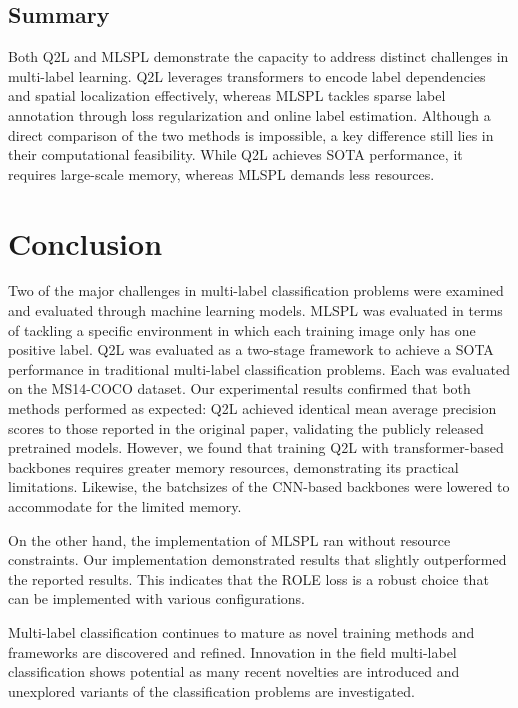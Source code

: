 \documentclass[lettersize,journal]{IEEEtran}
\begin{document}
\subsection{Summary}
Both Q2L and MLSPL demonstrate the capacity to address distinct challenges in multi-label learning. Q2L leverages transformers to encode label dependencies and spatial localization effectively, whereas MLSPL tackles sparse label annotation through loss regularization and online label estimation. Although a direct comparison of the two methods is impossible, a key difference still lies in their computational feasibility. While Q2L achieves SOTA performance, it requires large-scale memory, whereas MLSPL demands less resources.



\section{Conclusion}
Two of the major challenges in multi-label classification problems were examined and evaluated through machine learning models. MLSPL was evaluated in terms of tackling a specific environment in which each training image only has one positive label. Q2L was evaluated as a two-stage framework to achieve a SOTA performance in traditional multi-label classification problems. Each was evaluated on the MS14-COCO dataset. 
Our experimental results confirmed that both methods performed as expected: Q2L achieved identical mean average precision scores to those reported in the original paper, validating the publicly released pretrained models. However, we found that training Q2L with transformer-based backbones requires greater memory resources, demonstrating its practical limitations. Likewise, the batchsizes of the CNN-based backbones were lowered to accommodate for the limited memory.

On the other hand, the implementation of MLSPL ran without resource constraints. Our implementation demonstrated results that slightly outperformed the reported results. This indicates that the ROLE loss is a robust choice that can be implemented with various configurations. 

Multi-label classification continues to mature as novel training methods and frameworks are discovered and refined.  Innovation in the field multi-label classification shows potential as many recent novelties are introduced and unexplored variants of the classification problems are investigated. 
\end{document}
